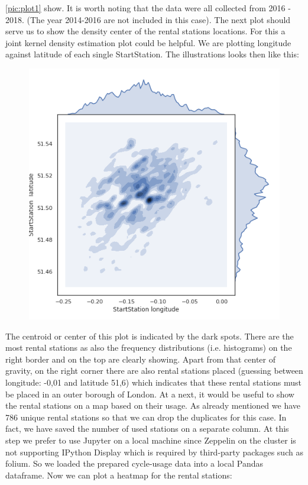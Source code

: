 \documentclass[12pt]{article}
\begin{document}
\ref{pic:plot1} show. It is worth noting that the data were all collected from 2016 - 2018. (The year 2014-2016 are not included in this case). 
The next plot should serve us to show the density center of the rental stations locations. For this a joint
kernel density estimation plot could be helpful. We are plotting longitude against latitude of each single
StartStation. The illustrations looks then like this:
\begin{figure}[H]
\hspace{-0.8cm}
\includegraphics[width=1.1\textwidth]{img/plot2}\label{pic:plot2}
\label{pic:plot2}
\end{figure}
\noindent 
The centroid or center of this plot is indicated by the dark spots. There are the most rental stations as also the frequency distributions (i.e. histograms) on the right border and on the top are clearly showing. Apart from that center of gravity, on the right corner there are also rental stations placed (guessing between longitude: -0,01 and latitude 51,6) which indicates that these rental stations must be placed in an outer borough of London. At a next, it would be useful to show the rental stations on a map based on their usage. As already mentioned we have 786 unique rental stations so that we can drop the duplicates for this case. In fact, we have saved the number of used stations on a separate column. At this step we prefer to use Jupyter on a local machine since Zeppelin on the cluster is not supporting IPython Display which is required by third-party packages such as folium. So we loaded the prepared cycle-usage data into a local Pandas dataframe. Now we can plot a heatmap for the rental stations:
\end{document}
